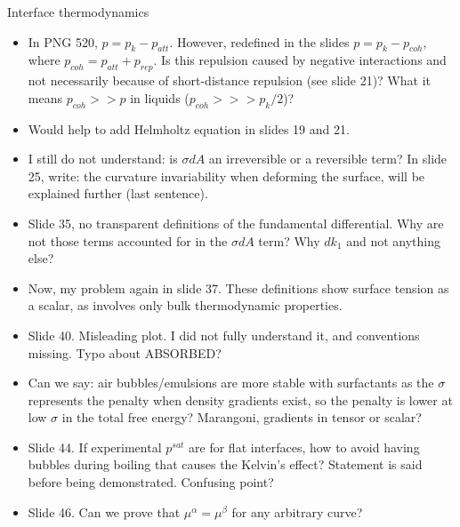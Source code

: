 \documentclass[8pt]{beamer}
\begin{document}
	\begin{frame}{Interface thermodynamics}
		\begin{itemize}
			\item In PNG 520, $p = p_k - p_{att}$. However, redefined in the slides $p = p_k - p_{coh}$, where $p_{coh} = p_{att} + p_{rep}$. Is this repulsion caused by negative interactions and not necessarily because  of short-distance repulsion (see slide 21)? What it means $p_{coh}>> p $ in liquids ($p_{coh} >>> p_k/2$)?
			
			\item Would help to add Helmholtz equation in slides 19 and 21.
			
			\item I still do not understand: is $\sigma dA$ an irreversible or a reversible term? In slide 25, write: the curvature invariability when deforming the surface, will be explained further (last sentence).
			
			\item Slide 35, no transparent definitions of the fundamental differential. Why are not those terms accounted for in the $\sigma dA$ term? Why $dk_1$ and not anything else?
			
			\item Now, my problem again in slide 37. These definitions show surface tension as a scalar, as involves only bulk thermodynamic properties.
			
			\item Slide 40. Misleading plot. I did not fully understand it, and conventions missing. Typo about ABSORBED?
			
			\item Can we say: air bubbles/emulsions are more stable with surfactants as the $\sigma$ represents the penalty when density gradients exist, so the penalty is lower at low $\sigma$ in the total free energy? Marangoni, gradients in tensor or scalar?
			
			\item Slide 44. If experimental $p^{sat}$ are for flat interfaces, how to avoid having bubbles during boiling that causes the Kelvin's effect? Statement is said before being demonstrated. Confusing point?
			
			\item Slide 46. Can we prove that $\mu^\alpha = \mu^\beta$ for any arbitrary curve?
		\end{itemize}
	\end{frame}
\end{document}
